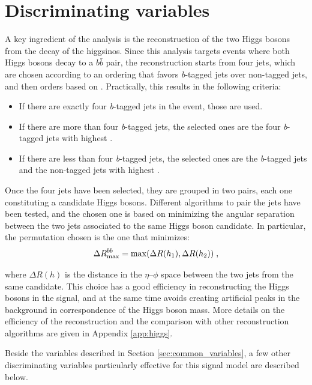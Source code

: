 \section{Discriminating variables}
\label{sec:ewk:sigbkg}

A key ingredient of the analysis is the reconstruction of the two Higgs bosons from the decay of the higgsinos.
Since this analysis targets events where both Higgs bosons decay to a $b\bar{b}$ pair, the reconstruction starts 
from four jets, which are chosen according to an ordering that favors \textit{b}-tagged jets over non-tagged jets,
and then orders based on \pt. Practically, this results in the following criteria:
\begin{itemize}
\item If there are exactly four \textit{b}-tagged jets in the event, those are used.
\item If there are more than four \textit{b}-tagged jets, the selected ones are the four \textit{b}-tagged jets with highest \pt.
\item If there are less than four \textit{b}-tagged jets, the selected ones are the \textit{b}-tagged jets and the non-tagged jets with highest \pt.
\end{itemize} 

Once the four jets have been selected, they are grouped in two pairs, each one constituting a candidate Higgs bosons. 
Different algorithms to pair the jets have been tested, and the chosen one is based on minimizing the angular separation 
between the two jets associated to the same Higgs boson candidate. 
In particular, the permutation chosen is the one that minimizes:
\begin{equation}
\Delta R_{\mathrm{max}}^{bb} = \mathrm{max}(\Delta R(h_1), \Delta R(h_2)) \; , \nonumber
\end{equation}

\noindent where $\Delta R(h)$ is the distance in the $\eta$--$\phi$ space between the two jets from the same candidate.
This choice has a good efficiency in reconstructing the Higgs bosons in the signal, 
and at the same time avoids creating artificial peaks in the background in correspondence of the Higgs boson mass. 
More details on the efficiency of the reconstruction and the comparison with other reconstruction algorithms are given in 
Appendix \ref{app:higgs}.

Beside the variables described in Section \ref{sec:common_variables}, a few other discriminating variables particularly 
effective for this signal model are described below.

